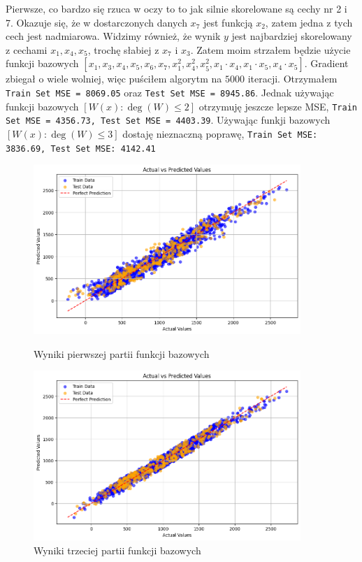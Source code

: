 \documentclass[polish,12pt,a4paper]{extarticle}
\renewcommand\leq{\leqslant}
\begin{document}
Pierwsze, co bardzo się rzuca w oczy to to jak silnie skorelowane są cechy nr 2 i 7. Okazuje się, że w dostarczonych danych $x_7$ jest funkcją $x_2$, zatem jedna z tych cech jest nadmiarowa. Widzimy również, że wynik $y$ jest najbardziej skorelowany z cechami $x_1, x_4, x_5$, trochę słabiej z $x_7$ i $x_3$. Zatem moim strzałem będzie użycie funkcji bazowych $[x_1, x_3, x_4, x_5, x_6, x_7, x_1^2, x_4^2, x_5^2, x_1 \cdot x_4, x_1 \cdot x_5, x_4 \cdot x_5]$. Gradient zbiegał o wiele wolniej, więc puściłem algorytm na $5000$ iteracji. Otrzymałem \texttt{Train Set MSE = 8069.05} oraz \texttt{Test Set MSE = 8945.86}. Jednak używając funkcji bazowych $[W(x) : \deg(W) \leq 2]$ otrzymuję jeszcze lepsze MSE, \texttt{Train Set MSE = 4356.73, Test Set MSE = 4403.39}. Używając funkji bazowych $[W(x) : \deg(W) \leq 3]$ dostaję nieznaczną poprawę, \texttt{Train Set MSE: 3836.69, Test Set MSE: 4142.41}

\begin{figure}[h!]
    \centering
    \begin{minipage}[b]{0.48\textwidth}
    \includegraphics[width=0.9\textwidth]{data/first_custom.png}
    \caption{Wyniki pierwszej partii funkcji bazowych}
    \end{minipage} \hspace{}
    \begin{minipage}[b]{0.48\textwidth}
    \includegraphics[width=0.9\textwidth]{data/third_custom.png}
    \caption{Wyniki trzeciej partii funkcji bazowych}
    \end{minipage}
\end{figure} \\
\end{document}

